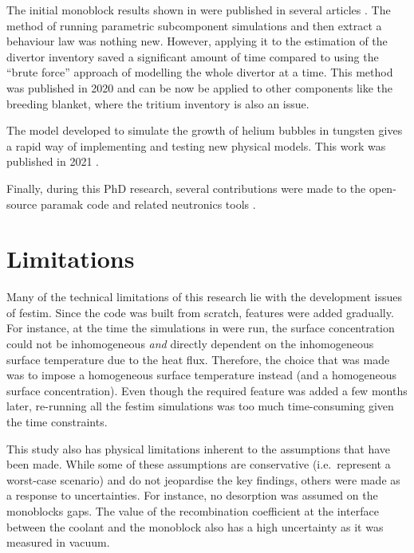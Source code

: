 The initial monoblock results shown in  were published in several articles \cite{delaporte-mathurin_finite_2019, delaporte-mathurin_parametric_2021, delaporte-mathurin_influence_2021-1}.
The method of running parametric subcomponent simulations and then extract a behaviour law was nothing new.
However, applying it to the estimation of the \gls{divertor} inventory saved a significant amount of time compared to using the ``brute force'' approach of modelling the whole \gls{divertor} at a time.
This method was published in 2020 \cite{delaporte-mathurin_parametric_2020} and can be now be applied to other components like the \gls{breeding blanket}, where the tritium inventory is also an issue.

The model developed to simulate the growth of helium bubbles in tungsten gives a rapid way of implementing and testing new physical models.
This work was published in 2021 \cite{delaporte-mathurin_influence_2021}.

Finally, during this PhD research, several contributions were made to the open-source \gls{paramak} code and related neutronics tools \cite{shimwell_paramak_2021}.

\section*{Limitations}

Many of the technical limitations of this research lie with the development issues of \gls{festim}.
Since the code was built from scratch, features were added gradually.
For instance, at the time the simulations in  were run, the surface concentration could not be inhomogeneous \emph{and} directly dependent on the inhomogeneous surface temperature due to the heat flux.
Therefore, the choice that was made was to impose a homogeneous surface temperature instead (and a homogeneous surface concentration).
Even though the required feature was added a few months later, re-running all the \gls{festim} simulations was too much time-consuming given the time constraints.

This study also has physical limitations inherent to the assumptions that have been made.
While some of these assumptions are conservative (i.e.\ represent a worst-case scenario) and do not jeopardise the key findings, others were made as a response to uncertainties.
For instance, no desorption was assumed on the monoblocks gaps.
The value of the recombination coefficient at the interface between the coolant and the monoblock also has a high uncertainty as it was measured in vacuum.


